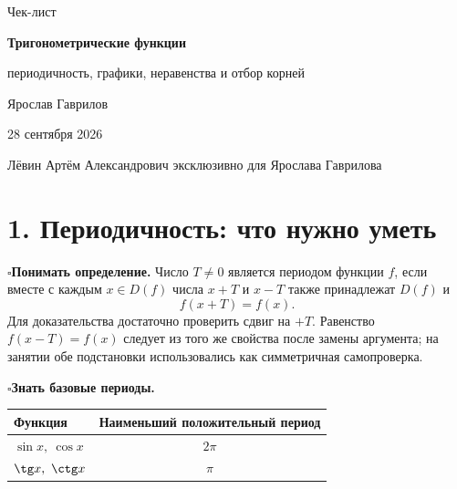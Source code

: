 \documentclass[a4paper,12pt]{article}
\newcommand{\checkitem}{\(\square\)\hspace{0.45em}}
\newcommand{\sectionrule}{\par\vspace{-0.3em}{\color{accent}\rule{\linewidth}{0.7pt}}\vspace{0.6em}}
\newcommand{\key}[1]{\textbf{\color{darkaccent}#1}}
\begin{document}
\thispagestyle{empty}
\begin{center}
\vspace*{18mm}
{\Large\color{warmgray}Чек-лист}\par
\vspace{7mm}
{\Huge\bfseries\color{darkaccent}Тригонометрические функции}\par
\vspace{3mm}
{\Large периодичность, графики, неравенства и отбор корней}\par
\vspace{18mm}
{\large Ярослав Гаврилов}\par
\vspace{4mm}
{\normalsize 28 сентября 2026}\par
\vfill
{\small\color{warmgray}Лёвин Артём Александрович эксклюзивно для Ярослава Гаврилова}\par
\vspace{9mm}
\end{center}
\clearpage

\section*{1. Периодичность: что нужно уметь}
\sectionrule

\checkitem \key{Понимать определение.} Число $T\ne0$ является периодом функции $f$, если вместе с каждым $x\in D(f)$ числа $x+T$ и $x-T$ также принадлежат $D(f)$ и
\[
 f(x+T)=f(x).
\]
Для доказательства достаточно проверить сдвиг на $+T$. Равенство $f(x-T)=f(x)$ следует из того же свойства после замены аргумента; на занятии обе подстановки использовались как симметричная самопроверка.

\checkitem \key{Знать базовые периоды.}
\begin{center}
\begin{tabular}{@{}lc@{}}
\toprule
\textbf{Функция} & \textbf{Наименьший положительный период}\\
\midrule
$\sin x,\ \cos x$ & $2\pi$\\
$\tg x,\ \ctg x$ & $\pi$\\
\bottomrule
\end{tabular}
\end{center}
\end{document}
